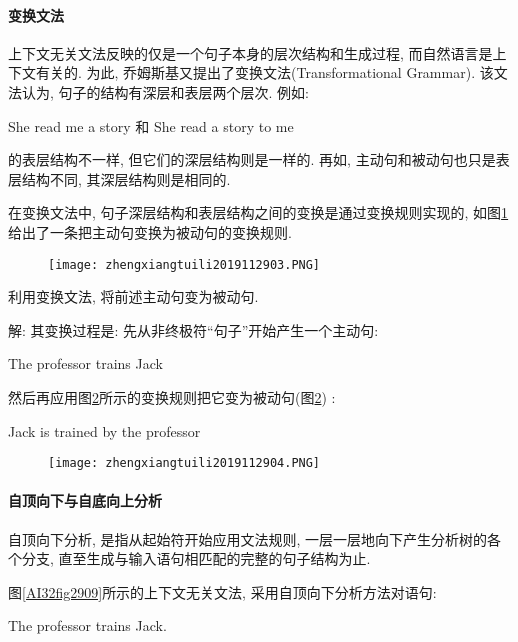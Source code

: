 \paragraph{变换文法}
上下文无关文法反映的仅是一个句子本身的层次结构和生成过程, 而自然语言是上下文有关的. 为此, 乔姆斯基又提出了变换文法(Transformational  Grammar). 该文法认为, 句子的结构有深层和表层两个层次. 例如:
\begin{center}
  She  read  me  a  story  和  She  read  a  story  to  me
\end{center}
的表层结构不一样, 但它们的深层结构则是一样的. 再如, 主动句和被动句也只是表层结构不同, 其深层结构则是相同的.

在变换文法中, 句子深层结构和表层结构之间的变换是通过变换规则实现的, 如图\ref{AI32fig2903}给出了一条把主动句变换为被动句的变换规则.
\begin{figure}[H]
\centering
\texttt{[image: zhengxiangtuili2019112903.PNG]}
\caption{}
\label{AI32fig2903}
\end{figure}
\begin{example}
    利用变换文法, 将前述主动句变为被动句.
\end{example}

解: 其变换过程是: 先从非终极符“句子”开始产生一个主动句:
\begin{center}
  The  professor  trains  Jack
\end{center}

然后再应用图\ref{AI32fig2904}所示的变换规则把它变为被动句(图\ref{AI32fig2904}) :
\begin{center}
  Jack  is  trained  by  the  professor
\end{center}
\begin{figure}[H]
\centering
\texttt{[image: zhengxiangtuili2019112904.PNG]}
\caption{}
\label{AI32fig2904}
\end{figure}
\paragraph{自顶向下与自底向上分析}
    自顶向下分析, 是指从起始符开始应用文法规则, 一层一层地向下产生分析树的各个分支, 直至生成与输入语句相匹配的完整的句子结构为止.

\begin{example}
图\ref{AI32fig2909}所示的上下文无关文法, 采用自顶向下分析方法对语句:
\begin{center}
  The  professor  trains  Jack.
\end{center}
\end{example}

